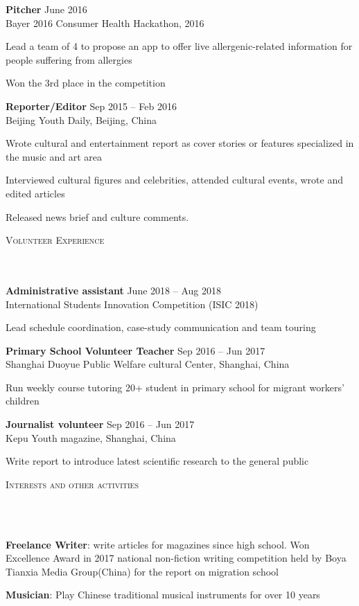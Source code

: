 \documentclass{article}
\newcommand{\header}[1]{{
\hspace*{-15pt}\vspace*{6pt} \textsc{#1}} \vspace*{-6pt} 
\lineunder
}
\newcommand{\lineunder}{
\vspace*{-8pt} \\ \hspace*{-18pt} 
\hrulefill \\
}
\newcommand{\employer}[4]{{
\vspace*{2pt}%
\textbf{#1} #2 \hfill #3\\ #4 \vspace*{2pt}}
}
\renewcommand{\labelitemii}{
$\vcenter{\hbox{\tiny$\bullet$}}$\hspace*{-3pt}
}
\newenvironment{bullet-list-major}{
\begin{list}{\labelitemii}{\setlength\leftmargin{3pt} 
\topsep 0pt \itemsep -2pt}}{\vspace*{4pt}\end{list}
}
\newenvironment{bullet-list-minor}{
\begin{list}{\labelitemii}{\setlength\leftmargin{15pt} 
\topsep 0pt \itemsep -2pt}}{\vspace*{4pt}\end{list}
}
\begin{document}
    \employer{Pitcher}{}{June 2016}{Bayer 2016 Consumer Health Hackathon, 2016}
	\begin{bullet-list-minor}
	\item Lead a team of 4 to propose an app to offer live
allergenic-related information for people suffering from allergies
    \item Won the 3rd place in the competition
    \end{bullet-list-minor}
    
    \employer{Reporter/Editor}{}{Sep 2015 -- Feb 2016}{Beijing Youth Daily, Beijing, China}
	\begin{bullet-list-minor}
	\item Wrote cultural and entertainment report as cover stories or features specialized in the music and art area  
	\item Interviewed cultural figures and celebrities, attended cultural events, wrote and edited articles
	\item Released news brief and culture comments.
    \end{bullet-list-minor}

\vspace*{4pt}%
\header{Volunteer Experience}
    \employer{Administrative assistant}{}{June 2018 -- Aug 2018}{International Students Innovation Competition (ISIC 2018)}
	\begin{bullet-list-minor}
	\item Lead schedule coordination, case-study communication and team touring
	\end{bullet-list-minor}
	
	\employer{Primary School Volunteer Teacher}{}{Sep 2016 -- Jun 2017}{Shanghai Duoyue Public Welfare cultural Center, Shanghai, China}
	\begin{bullet-list-minor}
	\item Run weekly course tutoring 20+ student in primary school for migrant workers' children
	\end{bullet-list-minor}
	
	\employer{Journalist volunteer}{}{Sep 2016 -- Jun 2017}{Kepu Youth magazine, Shanghai, China}
	\begin{bullet-list-minor}
	\item Write report to introduce latest scientific research to the general public  
	\end{bullet-list-minor}

\vspace*{4pt}%
\header{Interests and other activities}
    \begin{bullet-list-major}
    \item \textbf{Freelance Writer}: write articles for magazines since high school. Won Excellence Award in 2017 national non-fiction writing competition held by Boya Tianxia Media Group(China) for the report on migration school
    \vspace{2pt}
    \item \textbf{Musician}: Play Chinese traditional musical instruments for over 10 years
    \vspace{2pt}
    \end{bullet-list-major}
    
\end{document}
